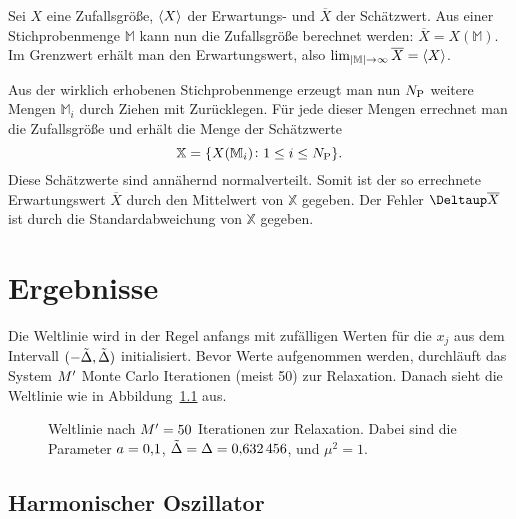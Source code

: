 Sei $X$ eine Zufallsgröße, $\langle X \rangle$ der Erwartungs- und $\overline X$ der
Schätzwert. Aus einer Stichprobenmenge $\mathbb M$ kann nun die Zufallsgröße
berechnet werden: $\overline X = X(\mathbb M)$. Im Grenzwert erhält man den
Erwartungswert, also $\lim_{|\mathbb M| \to \infty} \overline X = \langle X \rangle$.

Aus der wirklich erhobenen Stichprobenmenge erzeugt man nun $N_\text P$
weitere Mengen $\mathbb M_i$ durch Ziehen mit Zurücklegen. Für jede dieser
Mengen errechnet man die Zufallsgröße und erhält die Menge der Schätzwerte
\[
    \mathbb X = \{ X(\mathbb M_i) \colon 1 \leq i \leq N_\text P \}.
\]
Diese Schätzwerte sind annähernd normalverteilt. Somit ist der so errechnete
Erwartungswert $\overline X$ durch den Mittelwert von $\mathbb X$ gegeben. Der
Fehler $\Deltaup \overline X$ ist durch die Standardabweichung von $\mathbb X$
gegeben.

\chapter{Ergebnisse}

Die Weltlinie wird in der Regel anfangs mit zufälligen Werten für die $x_j$ aus
dem Intervall $(-\tilde \Delta, \tilde \Delta)$ initialisiert. Bevor
Werte aufgenommen werden, durchläuft das System $M'$ Monte Carlo
Iterationen (meist \num{50}) zur Relaxation. Danach sieht die Weltlinie wie in
Abbildung~\ref{fig:relaxiert} aus.

\begin{figure}[htbp]
    \centering
    \caption{%
        Weltlinie nach $M' = \num{50}$ Iterationen zur Relaxation.
        Dabei sind die Parameter $a = \num{0.1}$, $\tilde \Delta
        = \Delta = \num{0.632456}$, und $\mu^2 = \num{1}$.
    }
    \label{fig:relaxiert}
\end{figure}

\section{Harmonischer Oszillator}

